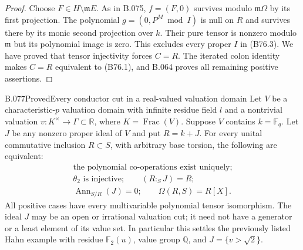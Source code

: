 \begin{proof}
Choose $F\in H\setminus\mathfrak mE$. As in B.075,
$f=(F,0)$ survives modulo $\mathfrak m\Omega$ by its first projection.
The polynomial $g=(0,P^M\bmod I)$ is null on $R$ and survives there
by its monic second projection over $k$.
Their pure tensor is nonzero modulo $\mathfrak m$ but its polynomial
image is zero. This excludes every proper $I$ in (B76.3).
We have proved that tensor injectivity forces $C=R$.
The iterated colon identity makes $C=R$ equivalent to (B76.1), and
B.064 proves all remaining positive assertions.
\end{proof}

\begin{saresult}{B.077}{Proved}{Every conductor cut in a real-valued valuation domain}
Let $V$ be a characteristic-$p$ valuation domain with infinite residue
field $l$ and a nontrivial valuation
$v:K^\times\to\Gamma\subset\mathbb R$, where
$K=\operatorname{Frac}(V)$. Suppose $V$ contains $k=\mathbb F_q$.
Let $J$ be any nonzero proper ideal of $V$ and put $R=k+J$.
For every unital commutative inclusion $R\subset S$, with arbitrary
base torsion, the following are equivalent:
\[
\begin{gathered}
 \text{the polynomial co-operations exist uniquely};\\
 \theta_2\text{ is injective};\qquad (R:_S J)=R;\\
 \operatorname{Ann}_{S/R}(J)=0;\qquad \Omega(R,S)=R[X].    \tag{B77.1}
\end{gathered}
\]
All positive cases have every multivariable polynomial tensor
isomorphism. The ideal $J$ may be an open or irrational valuation cut;
it need not have a generator or a least element of its value set.
In particular this settles the previously listed Hahn example with
residue $\mathbb F_2(u)$, value group $\mathbb Q$, and $J=\{v>\sqrt2\}$.
\end{saresult}
